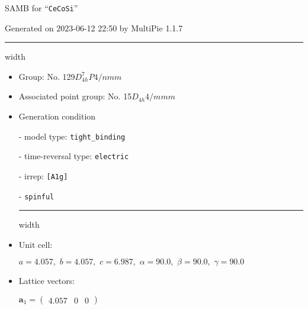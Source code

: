 \documentclass[fleqn,10pt,landscape]{article}
\begin{document}
\setcounter{MaxMatrixCols}{16}

\setlength{\baselineskip}{16pt}
\footnotesize
\begin{center}
\LARGE
SAMB for ``\texttt{CeCoSi}''
\end{center}
\begin{flushright}
Generated on 2023-06-12 22:50 by MultiPie 1.1.7
\end{flushright}
\vspace{1cm}


 \hfil \hrule height 1mm width \textwidth \hfil

\begin{itemize}
\item Group: No. 129\quad$D_{4h}^{7}$\quad$P4/nmm$\quad[ tetragonal ]

\item Associated point group: No. 15\quad$D_{4h}$\quad$4/mmm$\quad[ tetragonal ]

\vspace{5mm}

\item Generation condition

\quad - model type: \texttt{tight_binding}

\quad - time-reversal type: \texttt{electric}

\quad - irrep: \texttt{[A1g]}

\quad - \texttt{spinful}


 \hfil \hrule height 1mm width \textwidth \hfil

\item Unit cell:

\quad $a=4.057,\,\, b=4.057,\,\, c=6.987,\,\, \alpha=90.0,\,\, \beta=90.0,\,\, \gamma=90.0$

\item Lattice vectors:

\quad $\bm{a}_1=\begin{pmatrix} 4.057 & 0 & 0 \end{pmatrix}$


\end{itemize}
\end{document}
